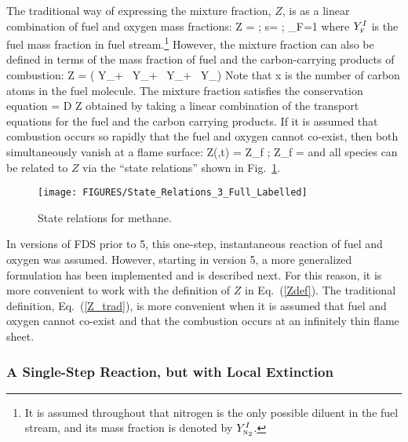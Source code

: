 \documentclass[11pt]{book}
\begin{document}
The traditional way of expressing the mixture fraction, $Z$, is as a linear combination of fuel and oxygen mass fractions:
\be
   Z =  \quad ; \quad  s=  \quad ; \quad \nu_F=1  \label{Z_trad}
\ee
where $Y_{\tiny \hbox{F}}^I$ is the fuel mass fraction in fuel stream.\footnote{It is assumed throughout that nitrogen is the only possible diluent in the fuel stream, and its mass
fraction is denoted by $Y_{\tiny \hbox{N}_2}^I$.}
However, the mixture fraction can also be defined in terms of the mass fraction of fuel
and the carbon-carrying products of combustion:
\be
   Z =  \left( Y_\F +  \, Y_\COTWO +  \, Y_\CO  +  \, Y_\So  \right)
\label{Zdef} \ee
Note that x is the number of carbon atoms in the fuel molecule. The mixture fraction satisfies the conservation equation
\be \rho {} = \nabla \cdot \rho D \nabla Z \label{Zeqn} \ee
obtained by taking a linear combination of the transport equations for the fuel and the carbon carrying products.
If it is assumed that combustion occurs so rapidly that the fuel and oxygen cannot
co-exist, then both simultaneously vanish at a flame surface:
\be Z(\bx,t) = Z_f \quad ; \quad
Z_f =    \label{flamesheet} \ee
and all species can be related to $Z$ via the  ``state relations'' shown in Fig.~\ref{staterelations}.
\begin{figure}
\begin{minipage}[t]{4.1in}
\texttt{[image: FIGURES/State\_Relations\_3\_Full\_Labelled]}
\caption{State relations for methane.}
\label{staterelations}
\end{minipage}
\end{figure}
In versions of FDS prior to 5, this one-step, instantaneous reaction of fuel and oxygen was assumed. However, starting in version 5, a more
generalized formulation has been implemented and is described next. For this reason, it is more convenient to work with the definition of $Z$ in
Eq.~(\ref{Zdef}). The traditional definition, Eq.~(\ref{Z_trad}), is more convenient when it is assumed that fuel and oxygen cannot co-exist and that
the combustion occurs at an infinitely thin flame sheet.


\subsubsection{A Single-Step Reaction, but with Local Extinction}
\end{document}
